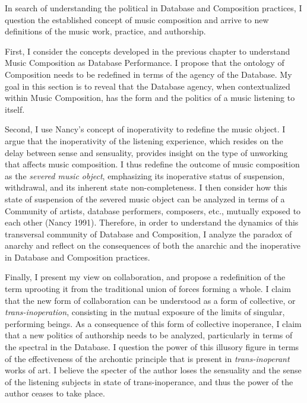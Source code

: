 In search of understanding the political in Database and Composition practices, I question the established concept of music composition and arrive to new definitions of the music work, practice, and authorship. 

First, I consider the concepts developed in the previous chapter to understand Music Composition as Database Performance. I propose that the ontology of Composition needs to be redefined in terms of the agency of the Database. My goal in this section is to reveal that the Database agency, when contextualized within Music Composition, has the form and the politics of a music listening to itself. 

Second, I use Nancy's concept of inoperativity to redefine the music object. I argue that the inoperativity of the listening experience, which resides on the delay between sense and sensuality, provides insight on the type of unworking that affects music composition. I thus redefine the outcome of music composition as the \textit{severed music object}, emphasizing its inoperative status of suspension, withdrawal, and its inherent state non-completeness. I then consider how this state of suspension of the severed music object can be analyzed in terms of a Community of artists, database performers, composers, etc., mutually exposed to each other (Nancy 1991). Therefore, in order to understand the dynamics of this transversal community of Database and Composition, I analyze the paradox of anarchy and reflect on the consequences of both the anarchic and the inoperative in Database and Composition practices. 

Finally, I present my view on collaboration, and propose a redefinition of the term uprooting it from the traditional union of forces forming a whole. I claim that the new form of collaboration can be understood as a form of collective, or \textit{trans-inoperation}, consisting in the mutual exposure of the limits of singular, performing beings. As a consequence of this form of collective inoperance, I claim that a new politics of authorship needs to be analyzed, particularly in terms of the spectral in the Database. I question the power of this illusory figure in terms of the effectiveness of the archontic principle that is present in \textit{trans-inoperant} works of art. I believe the specter of the author loses the sensuality and the sense of the listening subjects in state of trans-inoperance, and thus the power of the author ceases to take place.

